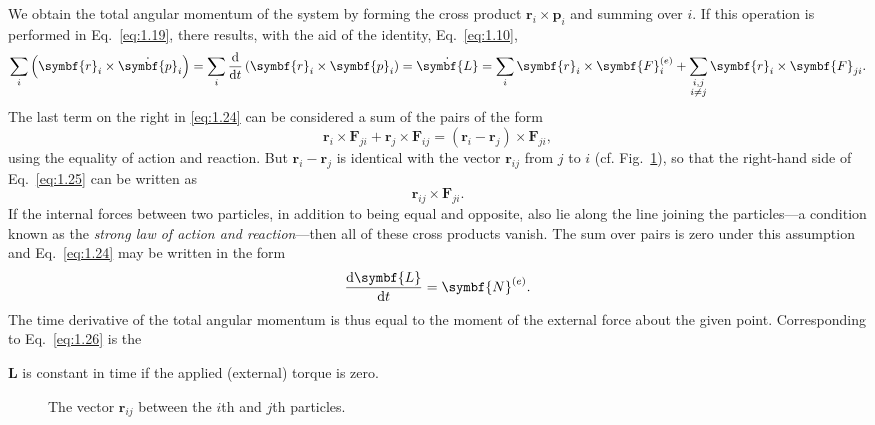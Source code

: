 We obtain the total angular momentum of the system by forming the cross product \(\symbf{r}_i\times\symbf{p}_i\) and summing over \(i\). If this operation is performed in Eq.~\eqref{eq:1.19}, there results, with the aid of the identity, Eq.~\eqref{eq:1.10},
\begin{equation}
    \sum_i\left(\symbf{r}_i\times\dot{\symbf{p}}_i\right)=\sum_i\odv*{\left(\symbf{r}_i\times\symbf{p}_i\right)}{t}=\dot{\symbf{L}}=\sum_i\symbf{r}_i\times\symbf{F}_i^{\left(e\right)}+\sum_{\substack{i,j\\i\ne j}}\symbf{r}_i\times\symbf{F}_{ji}.\label{eq:1.24}
\end{equation}
The last term on the right in \eqref{eq:1.24} can be considered a sum of the pairs of the form
\begin{equation}
    \symbf{r}_i\times\symbf{F}_{ji}+\symbf{r}_j\times\symbf{F}_{ij}=\left(\symbf{r}_i-\symbf{r}_j\right)\times\symbf{F}_{ji},\label{eq:1.25}
\end{equation}
using the equality of action and reaction. But \(\symbf{r}_i-\symbf{r}_j\) is identical with the vector \(\symbf{r}_{ij}\) from \(j\) to \(i\) (cf. Fig.~\ref{fig:1.2}), so that the right-hand side of Eq.~\eqref{eq:1.25} can be written as
\begin{equation*}
    \symbf{r}_{ij}\times\symbf{F}_{ji}.
\end{equation*}
If the internal forces between two particles, in addition to being equal and opposite, also lie along the line joining the particles---a condition known as the \emph{strong law of action and reaction}---then all of these cross products vanish. The sum over pairs is zero under this assumption and Eq.~\eqref{eq:1.24} may be written in the form
\begin{equation}
    \odv{\symbf{L}}{t}=\symbf{N}^{\left(e\right)}.\label{eq:1.26}
\end{equation}
The time derivative of the total angular momentum is thus equal to the moment of the external force about the given point. Corresponding to Eq.~\eqref{eq:1.26} is the
\begin{theorem}
    \(\symbf{L}\) is constant in time if the applied (external) torque is zero.
\end{theorem}

\begin{figure}[htbp]
    \centering
    \caption{The vector \(\symbf{r}_{ij}\) between the \(i\)th and \(j\)th particles.}
    \label{fig:1.2}
\end{figure}

